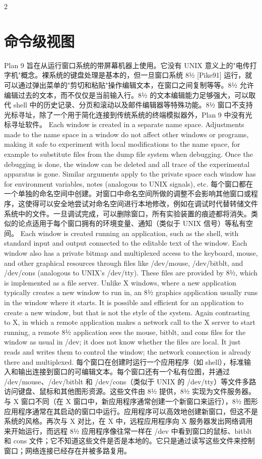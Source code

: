 \documentclass{article}
\begin{document}
\begin{paracol}{2}
\section*{命令级视图}
Plan 9 旨在从运行窗口系统的带屏幕机器上使用。它没有 UNIX 意义上的"电传打字机"概念。裸系统的键盘处理是基本的，但一旦窗口系统 8½ [Pike91] 运行，就可以通过弹出菜单的"剪切和粘贴"操作编辑文本，在窗口之间复制等等。8½ 允许编辑过去的文本，而不仅仅是当前输入行。8½ 的文本编辑能力足够强大，可以取代 shell 中的历史记录、分页和滚动以及邮件编辑器等特殊功能。8½ 窗口不支持光标寻址，除了一个用于简化连接到传统系统的终端模拟器外，Plan 9 中没有光标寻址软件。
\switchcolumn*
Each window is created in a separate name space. Adjustments made to the name space in a window do not affect other windows or programs, making it safe to experiment with local modifications to the name space, for example to substitute files from the dump file system when debugging. Once the debugging is done, the window can be deleted and all trace of the experimental apparatus is gone. Similar arguments apply to the private space each window has for environment variables, notes (analogous to UNIX signals), etc.
\switchcolumn
每个窗口都在一个单独的命名空间中创建。对窗口中命名空间所做的调整不会影响其他窗口或程序，这使得可以安全地尝试对命名空间进行本地修改，例如在调试时代替转储文件系统中的文件。一旦调试完成，可以删除窗口，所有实验装置的痕迹都将消失。类似的论点适用于每个窗口拥有的环境变量、通知（类似于 UNIX 信号）等私有空间。
\switchcolumn*
Each window is created running an application, such as the shell, with standard input and output connected to the editable text of the window. Each window also has a private bitmap and multiplexed access to the keyboard, mouse, and other graphical resources through files like /dev/mouse, /dev/bitblt, and /dev/cons (analogous to UNIX's /dev/tty). These files are provided by 8½, which is implemented as a file server. Unlike X windows, where a new application typically creates a new window to run in, an 8½ graphics application usually runs in the window where it starts. It is possible and efficient for an application to create a new window, but that is not the style of the system. Again contrasting to X, in which a remote application makes a network call to the X server to start running, a remote 8½ application sees the mouse, bitblt, and cons files for the window as usual in /dev; it does not know whether the files are local. It just reads and writes them to control the window; the network connection is already there and multiplexed.
\switchcolumn
每个窗口在创建时运行一个应用程序（如 shell），标准输入和输出连接到窗口的可编辑文本。每个窗口还有一个私有位图，并通过 /dev/mouse、/dev/bitblt 和 /dev/cons（类似于 UNIX 的 /dev/tty）等文件多路访问键盘、鼠标和其他图形资源。这些文件由 8½ 提供，8½ 实现为文件服务器。与 X 窗口不同（在 X 窗口中，新应用程序通常创建一个新窗口来运行），8½ 图形应用程序通常在其启动的窗口中运行。应用程序可以高效地创建新窗口，但这不是系统的风格。再次与 X 对比，在 X 中，远程应用程序向 X 服务器发出网络调用来开始运行，而远程 8½ 应用程序像往常一样在 /dev 中看到窗口的鼠标、bitblt 和 cons 文件；它不知道这些文件是否是本地的。它只是通过读写这些文件来控制窗口；网络连接已经存在并被多路复用。

\end{paracol}
\end{document}
